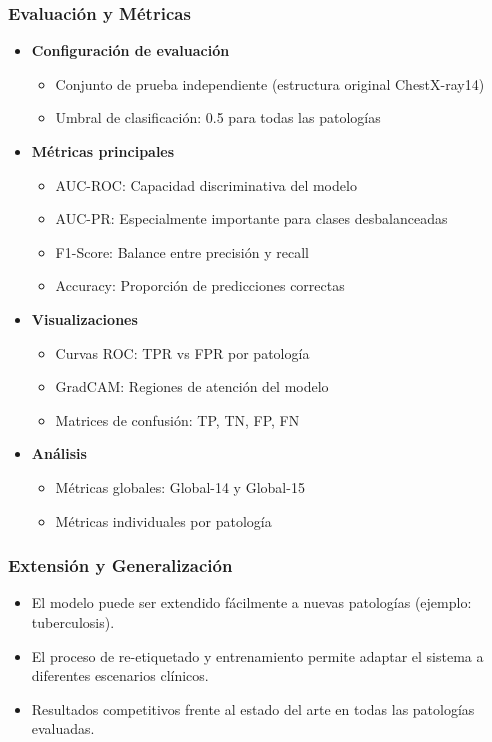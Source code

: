 \begin{frame}
\frametitle{Evaluación y Métricas}
\begin{itemize}
    \item \textbf{Configuración de evaluación}
    \begin{itemize}
        \item Conjunto de prueba independiente (estructura original ChestX-ray14)
        \item Umbral de clasificación: 0.5 para todas las patologías
    \end{itemize}
    \item \textbf{Métricas principales}
    \begin{itemize}
        \item AUC-ROC: Capacidad discriminativa del modelo
        \item AUC-PR: Especialmente importante para clases desbalanceadas
        \item F1-Score: Balance entre precisión y recall
        \item Accuracy: Proporción de predicciones correctas
    \end{itemize}
    \item \textbf{Visualizaciones}
    \begin{itemize}
        \item Curvas ROC: TPR vs FPR por patología
        \item GradCAM: Regiones de atención del modelo
        \item Matrices de confusión: TP, TN, FP, FN
    \end{itemize}
    \item \textbf{Análisis}
    \begin{itemize}
        \item Métricas globales: Global-14 y Global-15
        \item Métricas individuales por patología
    \end{itemize}
\end{itemize}
\end{frame}

\begin{frame}
\frametitle{Extensión y Generalización}
\begin{itemize}
    \item El modelo puede ser extendido fácilmente a nuevas patologías (ejemplo: tuberculosis).
    \item El proceso de re-etiquetado y entrenamiento permite adaptar el sistema a diferentes escenarios clínicos.
    \item Resultados competitivos frente al estado del arte en todas las patologías evaluadas.
\end{itemize}
\end{frame}

